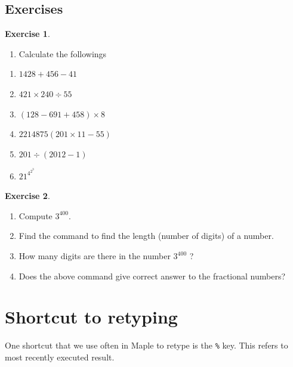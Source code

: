 \documentclass[
]{book}
\providecommand{\tightlist}{%
  \setlength{\itemsep}{0pt}\setlength{\parskip}{0pt}}
\theoremstyle{definition}
\theoremstyle{definition}
\theoremstyle{definition}
\newtheorem{exercise}{Exercise}[chapter]
\theoremstyle{definition}
\theoremstyle{remark}
\begin{document}
\subsection{Exercises}\label{exercises}

\begin{exercise}
\protect\hypertarget{exr:unnamed-chunk-2}{}\label{exr:unnamed-chunk-2}\leavevmode

\begin{enumerate}
\def\labelenumi{\arabic{enumi}.}
\tightlist
\item
  Calculate the followings
\end{enumerate}

\begin{enumerate}
\def\labelenumi{\roman{enumi}.}
\tightlist
\item
  \(1428 + 456 − 41\)
\item
  \(421 × 240 ÷ 55\)
\item
  \((128 − 691 + 458) × 8\)
\item
  \(2214875(201 × 11 − 55)\)
\item
  \(201 ÷ (2012 − 1)\)
\item
  \(21^{4^{2^3}}\)
\end{enumerate}

\end{exercise}

\begin{exercise}
\protect\hypertarget{exr:unnamed-chunk-3}{}\label{exr:unnamed-chunk-3}\leavevmode

\begin{enumerate}
\def\labelenumi{\roman{enumi}.}
\tightlist
\item
  Compute \(3^{400}\).
\item
  Find the command to find the length (number of digits) of a number.
\item
  How many digits are there in the number \(3^{400}\) ?
\item
  Does the above command give correct answer to the fractional numbers?
\end{enumerate}

\end{exercise}

\section{Shortcut to retyping}\label{shortcut-to-retyping}

One shortcut that we use often in Maple to retype is the \texttt{\%} key. This refers to most recently executed result.
\end{document}
